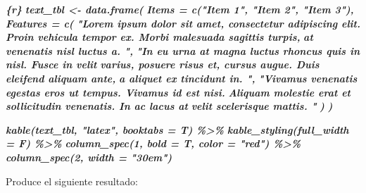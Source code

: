 \documentclass[12pt,a4paper,oneside,]{book}
\newenvironment{Shaded}{\begin{snugshade}}{\end{snugshade}}
\newcommand{\InformationTok}[1]{\textcolor[rgb]{0.56,0.35,0.01}{\textbf{\textit{#1}}}}
\numberwithin{dummy}{section}
\theoremstyle{ocrenumbox}
\theoremstyle{blacknumex}
\theoremstyle{blacknumbox}
\theoremstyle{ocrenum}
\theoremstyle{ocrenum}
\begin{document}
\begin{Shaded}
\begin{Highlighting}[]
\InformationTok{\textasciigrave{}\textasciigrave{}\textasciigrave{}\{r\}}
\InformationTok{text\_tbl \textless{}{-} data.frame(}
\InformationTok{  Items = c("Item 1", "Item 2", "Item 3"), }
\InformationTok{  Features = c(}
\InformationTok{    "Lorem ipsum dolor sit amet, consectetur adipiscing elit.}
\InformationTok{    Proin vehicula tempor ex. Morbi malesuada sagittis turpis,}
\InformationTok{    at venenatis nisl luctus a. ",}
\InformationTok{    "In eu urna at magna luctus rhoncus quis in nisl. Fusce in velit}
\InformationTok{    varius, posuere risus et, cursus augue. Duis eleifend aliquam ante,}
\InformationTok{    a aliquet ex tincidunt in. ",}
\InformationTok{    "Vivamus venenatis egestas eros ut tempus. Vivamus id est nisi.}
\InformationTok{    Aliquam molestie erat et sollicitudin venenatis. In ac lacus at}
\InformationTok{    velit scelerisque mattis. "}
\InformationTok{    ) }
\InformationTok{  )}

\InformationTok{kable(text\_tbl, "latex", booktabs = T) \%\textgreater{}\% }
\InformationTok{  kable\_styling(full\_width = F) \%\textgreater{}\% }
\InformationTok{  column\_spec(1, bold = T, color = "red") \%\textgreater{}\% }
\InformationTok{  column\_spec(2, width = "30em")}
\InformationTok{\textasciigrave{}\textasciigrave{}\textasciigrave{}}
\end{Highlighting}
\end{Shaded}

Produce el siguiente resultado:
\end{document}
